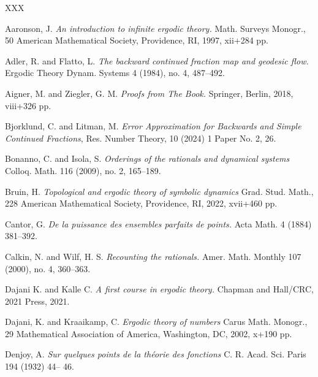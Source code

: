 \documentclass[letterpaper,10pt,reqno]{amsart}
\numberwithin{equation}{section}     %
\begin{document}
\begin{thebibliography}{XXX}


  Aaronson, J. \emph{An introduction to infinite ergodic theory.} Math. Surveys Monogr., 50
American Mathematical Society, Providence, RI, 1997, xii+284 pp.

 Adler, R. and Flatto, L. \emph{The backward continued fraction map and geodesic flow.}  Ergodic Theory Dynam. Systems  4  (1984),  no. 4, 487--492.


  Aigner, M. and Ziegler, G. M. \emph{Proofs from The Book.} Springer, Berlin, 2018, viii+326 pp.




 Bjorklund, C. and Litman, M. \emph{Error Approximation for Backwards and Simple Continued Fractions},
Res. Number Theory, 10 (2024) 1 Paper No. 2, 26.

 Bonanno, C. and  Isola, S. \emph{Orderings of the rationals and dynamical systems}
Colloq. Math. 116 (2009), no. 2, 165--189.




 Bruin, H. \emph{Topological and ergodic theory of symbolic dynamics}
Grad. Stud. Math., 228  American Mathematical Society, Providence, RI, 2022, xvii+460 pp.


 Cantor, G. \emph{De la puissance des ensembles parfaits de points.}  Acta Math. 4 (1884) 381--392.


 Calkin, N. and  Wilf, H. S. \emph{Recounting the rationals.}
Amer. Math. Monthly 107 (2000), no. 4, 360--363. 



 Dajani K. and Kalle C.   \emph{A first course in ergodic theory.} Chapman and Hall/CRC, 2021 Press, 2021.

 Dajani, K. and Kraaikamp, C. \emph{Ergodic theory of numbers} Carus Math. Monogr., 29
Mathematical Association of America, Washington, DC, 2002, x+190 pp.


 Denjoy, A. \emph{Sur quelques points de la th\'eorie des fonctions} C. R. Acad. Sci. Paris 194 (1932) 44--
46.


\end{thebibliography}
\end{document}
